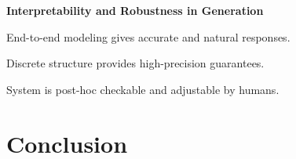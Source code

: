 \documentclass[aspectratio=169]{beamer}
\let\tempone\itemize
\let\temptwo\enditemize
\renewenvironment{itemize}{\tempone\addtolength{\itemsep}{0.5\baselineskip}}{\temptwo}
\newcommand{\thetitle}[1]{{\begin{center}\textbf{{#1}}\end{center}}}
\newcommand{\air}{\vspace{0.25cm}}
\begin{document}









\begin{frame}
  \thetitle{Interpretability and Robustness in Generation}

  \begin{itemize}
  \item End-to-end modeling gives accurate and natural responses.
    \air

  \item Discrete structure provides high-precision guarantees.
    \air

  \item System is post-hoc checkable and adjustable by humans.

  \end{itemize}

\end{frame}


\section{Conclusion}
\end{document}
